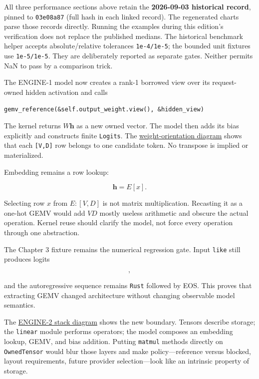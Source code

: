 All three performance sections above retain the \textbf{2026-09-03
historical record}, pinned to \texttt{03e08a87} (full hash in each
linked record). The regenerated charts parse those records directly.
Running the examples during this edition's verification does not replace
the published medians. The historical benchmark helper accepts
absolute/relative tolerances \texttt{1e-4/1e-5}; the bounded unit
fixtures use \texttt{1e-5/1e-5}. They are deliberately reported as
separate gates. Neither permits NaN to pass by a comparison trick.

The ENGINE-1 model now creates a rank-1 borrowed view over its
request-owned hidden activation and calls

\begin{verbatim}
gemv_reference(&self.output_weight.view(), &hidden_view)
\end{verbatim}

The kernel returns \(W\mathbf{h}\) as a new owned vector. The model then
adds its bias explicitly and constructs finite \texttt{Logits}. The
\href{https://github.com/hermonai/inside-the-llm-engine/blob/astra-visual-rewrite/diagrams/linear/weight-orientation.txt}{weight-orientation
diagram} shows that each \texttt{{[}V,D{]}} row belongs to one candidate
token. No transpose is implied or materialized.

Embedding remains a row lookup:

\begin{equation}
\mathbf{h}=E[x].
\end{equation}

Selecting row \(x\) from \(E:[V,D]\) is not matrix multiplication.
Recasting it as a one-hot GEMV would add \(VD\) mostly useless
arithmetic and obscure the actual operation. Kernel reuse should clarify
the model, not force every operation through one abstraction.

The Chapter 3 fixture remains the numerical regression gate. Input
\texttt{like} still produces logits

\begin{equation}
[-0.7,\ 0.1,\ 0.4,\ 2.2],
\end{equation}

and the autoregressive sequence remains \texttt{Rust} followed by EOS.
This proves that extracting GEMV changed architecture without changing
observable model semantics.

The
\href{https://github.com/hermonai/inside-the-llm-engine/blob/astra-visual-rewrite/diagrams/linear/engine-2-kernel-stack.txt}{ENGINE-2
stack diagram} shows the new boundary. Tensors describe storage; the
\texttt{linear} module performs operators; the model composes an
embedding lookup, GEMV, and bias addition. Putting \texttt{matmul}
methods directly on \texttt{OwnedTensor} would blur those layers and
make policy---reference versus blocked, layout requirements, future
provider selection---look like an intrinsic property of storage.

